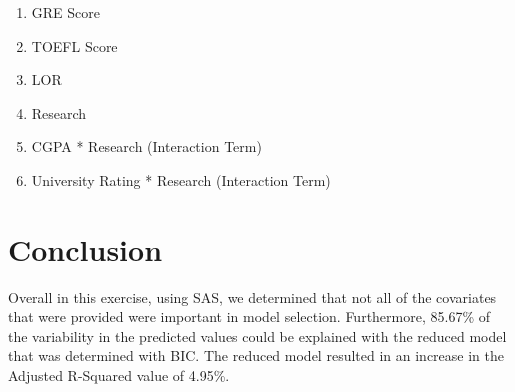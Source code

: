 \documentclass{article}
\begin{document}
\begin{enumerate}

\item GRE Score
\item TOEFL Score
\item LOR
\item Research
\item CGPA * Research (Interaction Term)
\item University Rating * Research (Interaction Term)

\end{enumerate}

\section*{Conclusion}

Overall in this exercise, using SAS, we determined that not all of the covariates that were provided were important in model selection. Furthermore, 85.67\% of the variability in the predicted values could be explained with the reduced model that was determined with BIC. The reduced model resulted in an increase in the Adjusted R-Squared value of 4.95\%. 
\end{document}
